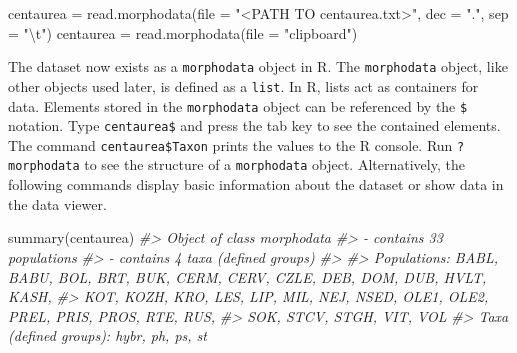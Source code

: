 \documentclass[
  11pt,
  a4paper]{article}
\newenvironment{Shaded}{\begin{snugshade}}{\end{snugshade}}
\newcommand{\AttributeTok}[1]{\textcolor[rgb]{0.77,0.63,0.00}{#1}}
\newcommand{\CommentTok}[1]{\textcolor[rgb]{0.56,0.35,0.01}{\textit{#1}}}
\newcommand{\FunctionTok}[1]{\textcolor[rgb]{0.00,0.00,0.00}{#1}}
\newcommand{\NormalTok}[1]{#1}
\newcommand{\OtherTok}[1]{\textcolor[rgb]{0.56,0.35,0.01}{#1}}
\newcommand{\SpecialCharTok}[1]{\textcolor[rgb]{0.00,0.00,0.00}{#1}}
\newcommand{\StringTok}[1]{\textcolor[rgb]{0.31,0.60,0.02}{#1}}
\begin{document}
\begin{Shaded}
\begin{Highlighting}[]
\NormalTok{centaurea }\OtherTok{=} \FunctionTok{read.morphodata}\NormalTok{(}\AttributeTok{file =} \StringTok{"\textless{}PATH TO centaurea.txt\textgreater{}"}\NormalTok{, }\AttributeTok{dec =} \StringTok{"."}\NormalTok{, }\AttributeTok{sep =} \StringTok{"}\SpecialCharTok{\textbackslash{}t}\StringTok{"}\NormalTok{)}
\NormalTok{centaurea }\OtherTok{=} \FunctionTok{read.morphodata}\NormalTok{(}\AttributeTok{file =} \StringTok{"clipboard"}\NormalTok{)}
\end{Highlighting}
\end{Shaded}

\vspace{+1cm}

The dataset now exists as a \texttt{morphodata} object in R. The
\texttt{morphodata} object, like other objects used later, is defined as
a \texttt{list}. In R, lists act as containers for data. Elements stored
in the \texttt{morphodata} object can be referenced by the \texttt{\$}
notation. Type \texttt{centaurea\$} and press the tab key to see the
contained elements. The command \texttt{centaurea\$Taxon} prints the
values to the R console. Run \texttt{?morphodata} to see the structure
of a \texttt{morphodata} object. Alternatively, the following commands
display basic information about the dataset or show data in the data
viewer.

\begin{Shaded}
\begin{Highlighting}[]
\FunctionTok{summary}\NormalTok{(centaurea)}
\CommentTok{\#\textgreater{} Object of class \textquotesingle{}morphodata\textquotesingle{}}
\CommentTok{\#\textgreater{} {-} contains 33 populations}
\CommentTok{\#\textgreater{} {-} contains 4 taxa (defined groups)}
\CommentTok{\#\textgreater{} }
\CommentTok{\#\textgreater{} Populations: BABL, BABU, BOL, BRT, BUK, CERM, CERV, CZLE, DEB, DOM, DUB, HVLT, KASH,}
\CommentTok{\#\textgreater{}  KOT, KOZH, KRO, LES, LIP, MIL, NEJ, NSED, OLE1, OLE2, PREL, PRIS, PROS, RTE, RUS,}
\CommentTok{\#\textgreater{}  SOK, STCV, STGH, VIT, VOL}
\CommentTok{\#\textgreater{} Taxa (defined groups): hybr, ph, ps, st}
\end{Highlighting}
\end{Shaded}

\vspace{-0.4cm}
\end{document}
